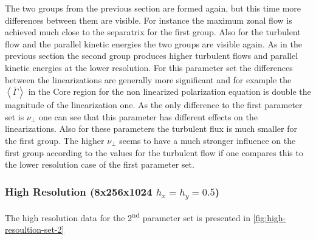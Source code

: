 \documentclass[master.tex]{subfiles}
\begin{document}
The two groups from the previous section are formed again, but this time more differences between them are visible. For instance the maximum zonal flow is achieved much close to the separatrix for the first group.\newline
Also for the turbulent flow and the parallel kinetic energies the two groups are visible again. As in the previous section the second group produces higher turbulent flows and parallel kinetic energies at the lower resolution.\newline
For this parameter set the differences between the linearizations are generally more significant and for example the $\left< \overline{\Gamma} \right>$ in the Core region for the non linearized polarization equation is double the magnitude of the linearization one. As the only difference to the first parameter set is $\nu_\perp$ one can see that this parameter has different effects on the linearizations.\newline
Also for these parameters the turbulent flux is much smaller for the first group. The higher $\nu_\perp$ seems to have a much stronger influence on the first group according to the values for the turbulent flow if one compares this to the lower resolution case of the first parameter set.


\subsubsection{High Resolution (8x256x1024 $h_x = h_y = 0.5$)}

The high resolution data for the 2\textsuperscript{nd} parameter set is presented in \autoref{fig:high-resoultion-set-2}
\end{document}
